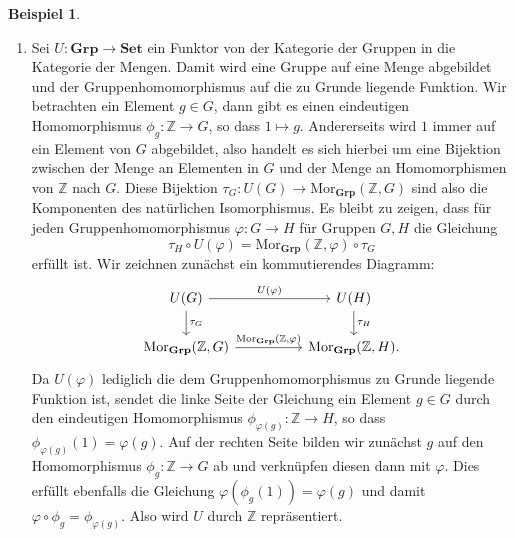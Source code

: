 \documentclass[leqno]{article}
\theoremstyle{plain}
\theoremstyle{definition}
\newtheorem{exmp}{Beispiel}[section]
\theoremstyle{remark}
\begin{document}
\begin{exmp}
	\begin{enumerate}
		\item Sei $U: \textbf{Grp} \rightarrow \textbf{Set}$ ein Funktor von der Kategorie der Gruppen in die Kategorie der Mengen. Damit wird eine Gruppe auf eine Menge abgebildet und der Gruppenhomomorphismus auf die zu Grunde liegende Funktion.
		Wir betrachten ein Element $g \in G$, dann gibt es einen eindeutigen Homomorphismus $\phi_g: \mathbb{Z} \rightarrow G$, so dass $1 \mapsto g$. Andererseits wird $1$ immer auf ein Element von $G$ abgebildet, also handelt es sich hierbei um eine Bijektion zwischen der Menge an Elementen in $G$ und der Menge an Homomorphismen von $\mathbb{Z}$ nach $G$. Diese Bijektion $\tau_G: U(G) \rightarrow \text{Mor}_{\textbf{Grp}}(\mathbb{Z},G)$ sind also die Komponenten des natürlichen Isomorphismus. Es bleibt zu zeigen, dass für jeden Gruppenhomomorphismus $\varphi: G \rightarrow H$ für Gruppen $G,H$ die Gleichung
		\begin{equation}
		\tau_H \circ U(\varphi) = \text{Mor}_{\textbf{Grp}}(\mathbb{Z},\varphi) \circ \tau_G
		\end{equation}
		erfüllt ist. Wir zeichnen zunächst ein kommutierendes Diagramm:
		\begin{equation}
			\begin{tikzcd}
			U(G) \arrow[rr, "U(\varphi)"] \arrow[d, "\tau_G"]                                                     &  & U(H) \arrow[d, "\tau_H"]                 \\
			{\text{Mor}_{\textbf{Grp}}(\mathbb{Z},G)} \arrow[rr, "{\text{Mor}_{\textbf{Grp}}(\mathbb{Z},\varphi)}"] &  & {\text{Mor}_{\textbf{Grp}}(\mathbb{Z},H)}.
			\end{tikzcd}
		\end{equation}
		Da $U(\varphi)$ lediglich die dem Gruppenhomomorphismus zu Grunde liegende Funktion ist, sendet die linke Seite der Gleichung ein Element $g \in G$ durch den eindeutigen Homomorphismus $\phi_{\varphi(g)}: \mathbb{Z} \rightarrow H$, so dass $\phi_{\varphi(g)}(1)=\varphi(g)$. Auf der rechten Seite bilden wir zunächst $g$ auf den Homomorphismus $\phi_g:\mathbb{Z} \rightarrow G$ ab und verknüpfen diesen dann mit $\varphi$. Dies erfüllt ebenfalls die Gleichung $\varphi(\phi_g(1)) = \varphi(g)$ und damit $\varphi \circ \phi_g = \phi_{\varphi(g)}$. Also wird $U$ durch $\mathbb{Z}$ repräsentiert.
	\end{enumerate}
\end{exmp}
\end{document}
